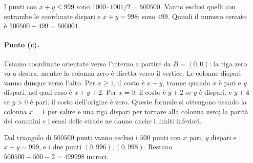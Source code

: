 {I punti con $x+y\leq999$ sono $1000\cdot1001/2=500500$. Vanno esclusi quelli con entrambe le coordinate dispari e $x+y=998$: sono $499$. Quindi il numero cercato è $500500-499=500001$.

\paragraph{Punto (c).}
Usiamo coordinate orientate verso l'interno a partire da $B=(0,0)$: la riga zero va a destra, mentre la colonna zero è diretta verso il vertice. Le colonne dispari vanno dunque verso l'alto. Per $x\geq1$, il costo è $x+y$, tranne quando $x$ è pari e $y$ dispari, nel qual caso è $x+y+2$. Per $x=0$, il costo è $y+2$ se $y$ è dispari, e $y+4$ se $y>0$ è pari; il costo dell'origine è zero. Queste formule si ottengono usando la colonna $x=1$ per salire e una riga dispari per tornare alla colonna zero; la parità dei cammini e i sensi delle strade ne danno anche i limiti inferiori.

Dal triangolo di $500500$ punti vanno esclusi i $500$ punti con $x$ pari, $y$ dispari e $x+y=999$, e i due punti $(0,996),(0,998)$. Restano $500500-500-2=499998$ incroci.
}
